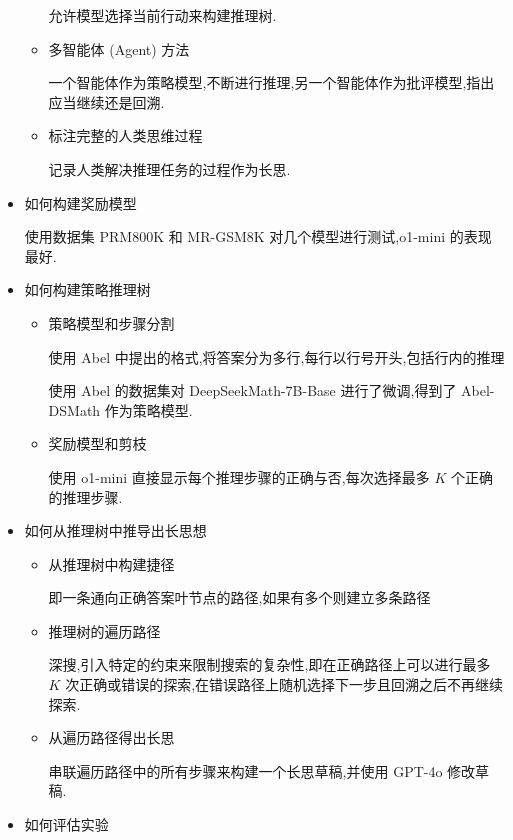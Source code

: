 \begin{itemize}
\begin{itemize}
                    允许模型选择当前行动来构建推理树.
                \item 多智能体 (Agent) 方法

                    一个智能体作为策略模型,不断进行推理,另一个智能体作为批评模型,指出应当继续还是回溯.
                \item 标注完整的人类思维过程

                    记录人类解决推理任务的过程作为长思.
            \end{itemize}
        \item 如何构建奖励模型

            使用数据集 PRM800K 和 MR-GSM8K 对几个模型进行测试,o1-mini 的表现最好.
        \item 如何构建策略推理树
            \begin{itemize}
                \item 策略模型和步骤分割

                    使用 Abel 中提出的格式,将答案分为多行,每行以行号开头,包括行内的推理

                    使用 Abel 的数据集对 DeepSeekMath-7B-Base 进行了微调,得到了 Abel-DSMath 作为策略模型.
                \item 奖励模型和剪枝

                    使用 o1-mini 直接显示每个推理步骤的正确与否,每次选择最多 $K$ 个正确的推理步骤.
            \end{itemize}
        \item 如何从推理树中推导出长思想

            \begin{itemize}
                \item 从推理树中构建捷径

                    即一条通向正确答案叶节点的路径,如果有多个则建立多条路径
                \item 推理树的遍历路径

                    深搜,引入特定的约束来限制搜索的复杂性,即在正确路径上可以进行最多 $K$ 次正确或错误的探索,在错误路径上随机选择下一步且回溯之后不再继续探索.
                \item 从遍历路径得出长思

                    串联遍历路径中的所有步骤来构建一个长思草稿,并使用 GPT-4o 修改草稿.
            \end{itemize}
        \item 如何评估实验


\end{itemize}
